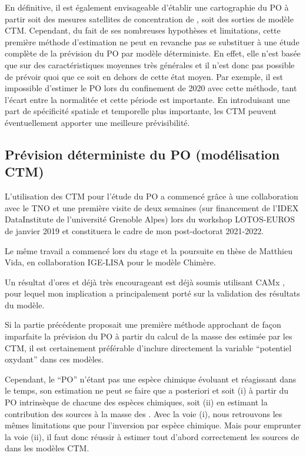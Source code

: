 \bigskip

En définitive, il est également envisageable d'établir une cartographie du PO à partir
soit des mesures satellites de concentration de \PMdix, soit des sorties de modèle CTM.
Cependant, du fait de ses nombreuses hypothèses et limitations, cette première méthode
d'estimation ne peut en revanche pas se substituer à une étude complète de la prévision du
PO par modèle déterministe.
En effet, elle n'est basée que sur des caractéristiques moyennes très générales et il
n'est donc pas possible de prévoir quoi que ce soit en dehors de cette état moyen. Par
exemple, il est impossible d'estimer le PO lors du confinement de 2020 avec cette
méthode, tant l'écart entre la normalitée et cette période est importante.
En introduisant une part de spécificité spatiale et temporelle plus importante, les CTM
peuvent éventuellement apporter une meilleure prévisibilité.

\subsection{Prévision déterministe du PO (modélisation CTM)}

\begin{tcolorbox}[colback=red!5!white,colframe=Melon,title=Note]
    L'utilisation des CTM pour l'étude du PO a commencé grâce à une collaboration avec le
    TNO et une première visite de deux semaines (sur financement de l'IDEX DataInstitute de l'université Grenoble Alpes) lors du
    workshop LOTOS-EUROS de janvier 2019 et constituera le cadre de mon post-doctorat 2021-2022.

    Le même travail a commencé lors du stage et la poursuite en thèse de Matthieu Vida, en
    collaboration IGE-LISA pour le modèle Chimère.

    Un résultat d'ores et déjà très encourageant est déjà soumis utilisant CAMx
    \parencite{daellenbachSourcessubmitted}, pour lequel mon implication a principalement
    porté sur la validation des résultats du modèle.
\end{tcolorbox}

Si la partie précédente proposait une première méthode approchant de façon imparfaite la prévision du PO à partir
du calcul de la masse des \PMdix{} estimée par les CTM, il est certainement
préférable d'inclure directement la variable ``potentiel oxydant'' dans ces modèles.

Cependant, le ``PO'' n'étant pas une espèce chimique évoluant et réagissant dans le temps, son
estimation ne peut se faire que a posteriori et soit (i) à partir du PO intrinsèque de chacune
des espèces chimiques, soit (ii) en estimant la contribution des sources à la masse des \PMdix.
Avec la voie (i), nous retrouvons les mêmes limitations que pour l'inversion par espèce
chimique. Mais pour emprunter la voie (ii), il faut donc
réussir à estimer tout d'abord correctement les sources de \PMdix{} dans les modèles CTM.


